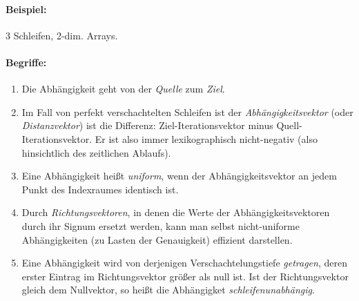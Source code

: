 \paragraph{Beispiel:} 3 Schleifen, 2-dim. Arrays.

\paragraph{Begriffe:}
\begin{enumerate}
\item Die Abhängigkeit geht von der \emph{Quelle} zum \emph{Ziel}.
\item Im Fall von perfekt verschachtelten Schleifen ist der
  \emph{Abhängigkeitsvektor} (oder \emph{Distanzvektor}) ist die Differenz: Ziel-Iterationsvektor minus
  Quell-Iterationsvektor. Er ist also immer lexikographisch nicht-negativ (also hinsichtlich des zeitlichen Ablaufs).
\item Eine Abhängigkeit heißt \emph{uniform}, wenn der Abhängigkeitsvektor an
  jedem Punkt des Indexraumes identisch ist.
\item Durch \emph{Richtungsvektoren}, in denen die Werte der
  Abhängigkeitsvektoren durch ihr Signum ersetzt werden, kann man selbst
  nicht-uniforme Abhängigkeiten (zu Lasten der Genauigkeit) effizient
  darstellen.
\item Eine Abhängigkeit wird von derjenigen Verschachtelungstiefe
  \emph{getragen}, deren erster Eintrag im Richtungsvektor größer als
  null ist. Ist der Richtungsvektor gleich dem Nullvektor, so heißt die
  Abhängigket \emph{schleifenunabhängig}.
\end{enumerate}
